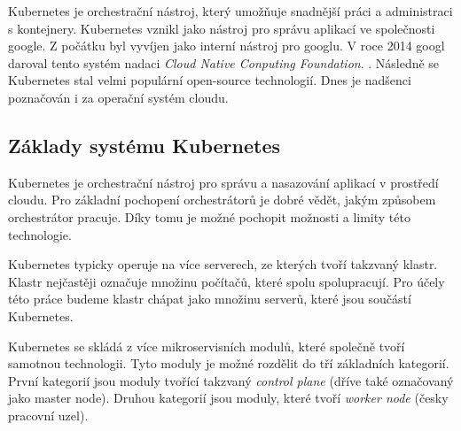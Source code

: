 \bigskip\medskip
Kubernetes je orchestrační nástroj, který umožňuje snadnější práci a administraci s kontejnery. Kubernetes vznikl jako nástroj pro správu aplikací ve společnosti google. Z počátku byl vyvíjen jako interní nástroj pro googlu. V roce 2014 googl daroval tento systém nadaci \textit{Cloud Native Conputing Foundation}. \cite{poulton_2022_the}. Následně se Kubernetes stal velmi populární open-source technologií. Dnes je nadšenci poznačován i za operační systém cloudu. \cite{poulton_2022_the}%


\subsection{Základy systému Kubernetes}

Kubernetes je orchestrační nástroj pro správu a nasazování aplikací v prostředí cloudu. Pro základní pochopení orchestrátorů je dobré vědět, jakým způsobem orchestrátor pracuje. Díky tomu je možné pochopit možnosti a limity této technologie.

Kubernetes typicky operuje na více serverech, ze kterých tvoří takzvaný klastr. Klastr nejčastěji označuje množinu počítačů, které spolu spolupracují. Pro účely této práce budeme klastr chápat jako množinu serverů, které jsou součástí Kubernetes.

Kubernetes se skládá z více mikroservisních modulů, které společně tvoří samotnou technologii. Tyto moduly je možné rozdělit do tří základních kategorií. První kategorií jsou moduly tvořící takzvaný \textit{control plane} (dříve také označovaný jako master node). Druhou kategorií jsou moduly, které tvoří \textit{worker node} (česky pracovní uzel).

